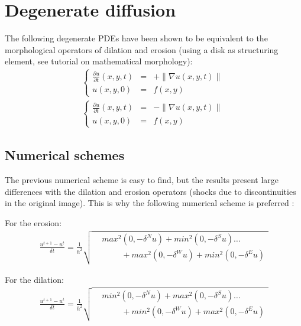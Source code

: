 \section{Degenerate diffusion}
The following degenerate PDEs have been shown to be equivalent to the morphological operators of dilation and erosion (using a disk as structuring element, see tutorial on mathematical morphology):\vspace*{-5pt}
\begin{eqnarray}
\left\{\begin{array}{ccl}
\displaystyle \frac{\partial u}{\partial t}(x,y,t)&=&+\|\nabla u(x,y,t)\|\\
u(x,y,0)&=&f(x,y)
\end{array}
\right.\\
\left\{\begin{array}{ccl}
\displaystyle \frac{\partial u}{\partial t}(x,y,t)&=&-\|\nabla u(x,y,t)\|\\
u(x,y,0)&=&f(x,y)
\end{array}
\right.
\end{eqnarray}

\subsection{Numerical schemes}
The previous numerical scheme is easy to find, but the results present large differences with the dilation and erosion operators (shocks due to discontinuities in the original image). This is why the following numerical scheme is preferred \cite{Maragos1996}:

For the erosion:\vspace*{-5pt}
\begin{align}\frac{u^{t+1}-u^t}{\delta t} = \frac{1}{h^2}
\sqrt{\begin{aligned}&max^2(0,-\delta^N u) + min^2(0,-\delta^S u) \dots\\
&\hspace{1cm}+ max^2(0,-\delta^W u) + min^2(0,-\delta^E u)
\end{aligned}
}
\end{align}

For the dilation:\vspace*{-5pt}
\begin{align}\frac{u^{t+1}-u^t}{\delta t} = \frac{1}{h^2}\sqrt{\begin{aligned}&min^2(0,-\delta^N u) + max^2(0,-\delta^S u) \dots\\
&\hspace{1cm}+ min^2(0,-\delta^W u) + max^2(0,-\delta^E u)
\end{aligned}                                                                 
}
\end{align}

